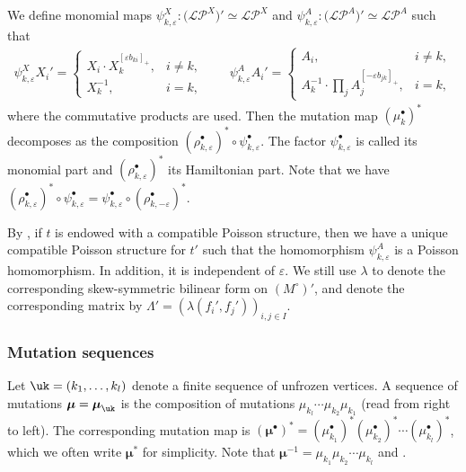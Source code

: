 \documentclass[pdftex]{sigma}
\newcommand{\Mc}{M^\circ}
\newcommand{\LP}{{\mathcal{LP}}}
\newcommand{\seq}{\boldsymbol{\mu}}%
\numberwithin{equation}{section}
\begin{document}
We define monomial maps $\psi_{k,\varepsilon}^{X}\colon\big(\LP^{X}\big)'\simeq\LP^{X}$
and $\psi_{k,\varepsilon}^{A}\colon\big(\LP^{A}\big)'\simeq\LP^{A}$ such that
\begin{gather*}
\psi_{k,\varepsilon}^{X}X_{i}' = \begin{cases}
X_{i}\cdot X_{k}^{[\varepsilon b_{ki}]_{+}}, & i\neq k,\\
X_{k}^{-1}, & i=k,
\end{cases}\qquad
\psi_{k,\varepsilon}^{A}A_{i}' = \begin{cases}
A_{i}, & i\neq k,\\
\displaystyle A_{k}^{-1}\cdot \prod_{j}A_{j}^{[-\varepsilon b_{jk}]_{+}}, & i=k,
\end{cases}
\end{gather*}
where the commutative products are used. Then the mutation map $(\mu_{k}^{\bullet})^{*}$ decomposes as the
composition $(\rho_{k,\varepsilon}^{\bullet})^{*}\circ\psi_{k,\varepsilon}^{\bullet}$.
The factor $\psi_{k,\varepsilon}^{\bullet}$ is called its monomial
part and $(\rho_{k,\varepsilon}^{\bullet})^{*}$ its Hamiltonian part. Note that
we have $(\rho_{k,\varepsilon}^{\bullet})^{*}\circ\psi_{k,\varepsilon}^{\bullet}=\psi_{k,\varepsilon}^{\bullet}\circ(\rho_{k,-\varepsilon}^{\bullet})^{*}$.

By \cite{BerensteinZelevinsky05}, if $t$ is endowed with a compatible Poisson structure, then we have a unique compatible Poisson structure for $t'$ such
that the homomorphism $\psi^{A}_{k,\varepsilon}$ is a Poisson homomorphism. In addition, it is independent of $\varepsilon$. We still use $\lambda$ to denote the corresponding skew-symmetric
bilinear form on $(\Mc)'$, and denote the corresponding matrix by
$\Lambda'=(\lambda(f_{i}',f_{j}'))_{i,j\in I}$.

\subsubsection*{Mutation sequences}
Let $\uk=(k_{1},\ldots,k_{l})$ denote a finite sequence of unfrozen vertices.
A sequence of mutations ${\seq=\seq_{\uk}}$ is the composition of mutations
$\mu_{k_{l}}\cdots\mu_{k_{2}}\mu_{k_{1}}$ (read from right to left).
The corresponding mutation map is $(\seq^{\bullet})^{*}=(\mu_{k_{1}}^{\bullet})^{*}(\mu_{k_{2}}^{\bullet})^{*}\cdots(\mu_{k_{l}}^{\bullet})^{*}$,
which we often write $\seq^{*}$ for simplicity. Note that $\seq^{-1}=\mu_{k_{1}}\mu_{k_{2}}\cdots \mu_{k_{l}}$ and \smash{$(\seq^*)^{-1}=\big(\seq^{-1}\big)^{*}$}.
\end{document}
